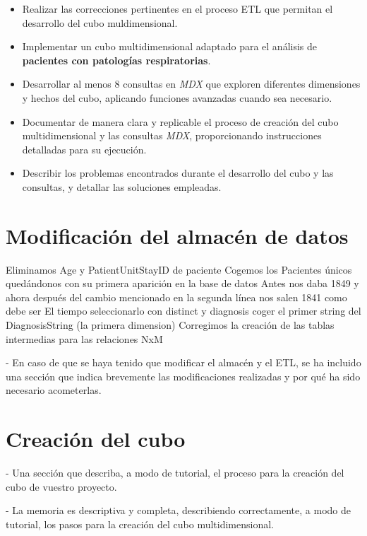 \documentclass[12pt, a4paper, twoside]{article}
\begin{document}
	\begin{itemize}
		\item Realizar las correcciones pertinentes en el proceso ETL que permitan el desarrollo del cubo muldimensional.
		\item Implementar un cubo multidimensional adaptado para el análisis de \textbf{pacientes con patologías respiratorias}.
		\item Desarrollar al menos 8 consultas en \textit{MDX} que exploren diferentes dimensiones y hechos del cubo, aplicando funciones avanzadas cuando sea necesario.
		\item Documentar de manera clara y replicable el proceso de creación del cubo multidimensional y las consultas \textit{MDX}, proporcionando instrucciones detalladas para su ejecución.
		\item Describir los problemas encontrados durante el desarrollo del cubo y las consultas, y detallar las soluciones empleadas.
	\end{itemize}
	
	
	 
	
	\section{Modificación del almacén de datos}
	
	Eliminamos Age y PatientUnitStayID de paciente
	Cogemos los Pacientes únicos quedándonos con su primera aparición en la base de datos
	Antes nos daba 1849 y ahora después del cambio mencionado en la segunda línea nos salen 1841 como debe ser
	El tiempo seleccionarlo con distinct y diagnosis coger el primer string del DiagnosisString (la primera dimension)
	Corregimos la creación de las tablas intermedias para las relaciones NxM
	
	
	
		- En caso de que se haya tenido que modificar el almacén y el ETL, se ha incluido una sección que indica brevemente las modificaciones realizadas y por qué ha sido necesario acometerlas.
	
	\section{Creación del cubo}
	
	  - Una sección que describa, a modo de tutorial, el proceso para la creación del cubo de vuestro proyecto. 
	  
	  
	  	- La memoria es descriptiva y completa, describiendo correctamente, a modo de tutorial, los pasos para la creación del cubo multidimensional.
	  
\end{document}
